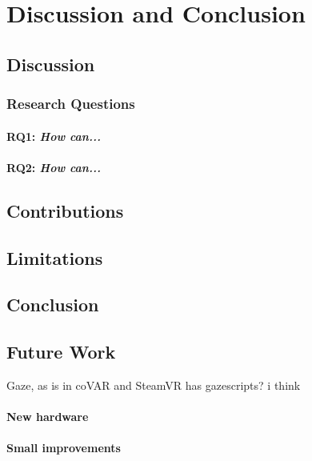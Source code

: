 
\chapter{Discussion and Conclusion}

\section{Discussion}


\subsection{Research Questions}  \label{RQDiscussion}


\subsubsection{RQ1: \textit{How can...}} 


\subsubsection{RQ2: \textit{How can...}}


\section{Contributions}



\section{Limitations}




\section{Conclusion}


\section{Future Work}

Gaze, as is in coVAR and SteamVR has gazescripts? i think  

\subsubsection{New hardware}

\subsubsection{Small improvements}

\cleardoublepage
